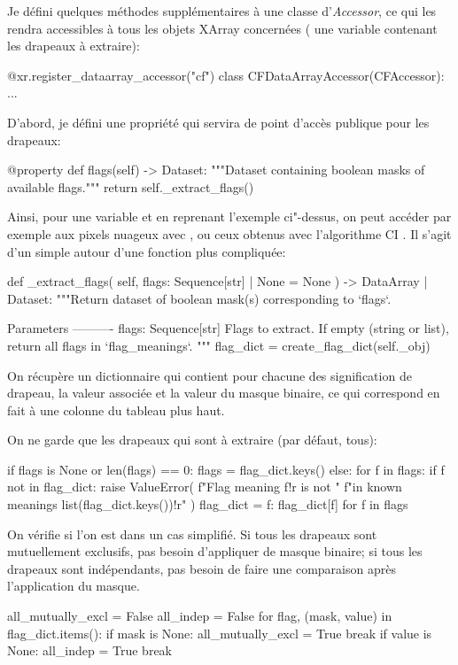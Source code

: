 Je défini quelques méthodes supplémentaires à une classe d'\emph{Accessor}, ce qui les rendra accessibles à tous les objets XArray concernées ( une variable  contenant les drapeaux à extraire):
\begin{python}
@xr.register_dataarray_accessor("cf")
class CFDataArrayAccessor(CFAccessor):
    ...
\end{python}

D'abord, je défini une propriété qui servira de point d'accès publique pour les drapeaux:
\begin{python}
@property
def flags(self) -> Dataset:
    """Dataset containing boolean masks of available flags."""
    return self._extract_flags()
\end{python}
Ainsi, pour une variable  et en reprenant l'exemple ci"-dessus, on peut accéder par exemple aux pixels nuageux avec , ou ceux obtenus avec l'algorithme CI .
Il s'agit d'un simple  autour d'une fonction plus compliquée:
\begin{pythonFirst}
def _extract_flags(
        self, flags: Sequence[str] | None = None
) -> DataArray | Dataset:
    """Return dataset of boolean mask(s) corresponding to `flags`.

    Parameters
    ----------
    flags: Sequence[str]
        Flags to extract. If empty (string or list),
        return all flags in `flag_meanings`.
    """
    flag_dict = create_flag_dict(self._obj)
\end{pythonFirst}
On récupère un dictionnaire qui contient pour chacune des signification de drapeau, la valeur associée et la valeur du masque binaire, ce qui correspond en fait à une colonne du tableau plus haut.

On ne garde que les drapeaux qui sont à extraire (par défaut, tous):
\begin{pythonMiddle}[]
    if flags is None or len(flags) == 0:
        flags = flag_dict.keys()
    else:
        for f in flags:
            if f not in flag_dict:
                raise ValueError(
                    f"Flag meaning {f!r} is not "
                    f"in known meanings {list(flag_dict.keys())!r}"
                )
        flag_dict = {f: flag_dict[f] for f in flags}
\end{pythonMiddle}

On vérifie si l'on est dans un cas simplifié. Si tous les drapeaux sont mutuellement exclusifs, pas besoin d'appliquer de masque binaire; si tous les drapeaux sont indépendants, pas besoin de faire une comparaison après l'application du masque.
\begin{pythonMiddle}[]
    all_mutually_excl = False
    all_indep = False
    for flag, (mask, value) in flag_dict.items():
        if mask is None:
            all_mutually_excl = True
            break
        if value is None:
            all_indep = True
            break
\end{pythonMiddle}

